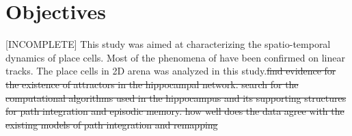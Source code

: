 \section{Objectives}
[INCOMPLETE]
This study was aimed at characterizing the spatio-temporal dynamics of place cells. Most of the phenomena of have been confirmed on linear tracks. The place cells in 2D arena was analyzed in this study.\st{find evidence for the existence of attractors in the hippocampal network. 
search for the computational algorithms used in the hippocampus and its supporting structures for path integration and episodic memory. how well does the data agree with the existing models of path integration and remapping}
